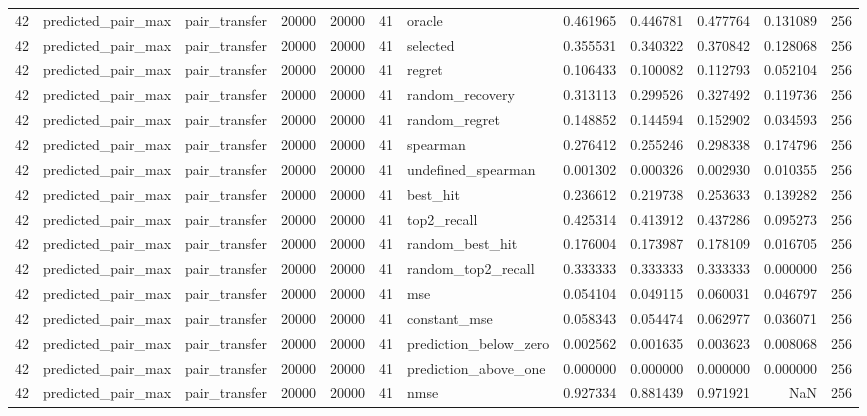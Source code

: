 \begin{tabular}{rllrrrlrrrrr}
42 & predicted_pair_max & pair_transfer & 20000 & 20000 & 41 & oracle & 0.461965 & 0.446781 & 0.477764 & 0.131089 & 256 \\
42 & predicted_pair_max & pair_transfer & 20000 & 20000 & 41 & selected & 0.355531 & 0.340322 & 0.370842 & 0.128068 & 256 \\
42 & predicted_pair_max & pair_transfer & 20000 & 20000 & 41 & regret & 0.106433 & 0.100082 & 0.112793 & 0.052104 & 256 \\
42 & predicted_pair_max & pair_transfer & 20000 & 20000 & 41 & random_recovery & 0.313113 & 0.299526 & 0.327492 & 0.119736 & 256 \\
42 & predicted_pair_max & pair_transfer & 20000 & 20000 & 41 & random_regret & 0.148852 & 0.144594 & 0.152902 & 0.034593 & 256 \\
42 & predicted_pair_max & pair_transfer & 20000 & 20000 & 41 & spearman & 0.276412 & 0.255246 & 0.298338 & 0.174796 & 256 \\
42 & predicted_pair_max & pair_transfer & 20000 & 20000 & 41 & undefined_spearman & 0.001302 & 0.000326 & 0.002930 & 0.010355 & 256 \\
42 & predicted_pair_max & pair_transfer & 20000 & 20000 & 41 & best_hit & 0.236612 & 0.219738 & 0.253633 & 0.139282 & 256 \\
42 & predicted_pair_max & pair_transfer & 20000 & 20000 & 41 & top2_recall & 0.425314 & 0.413912 & 0.437286 & 0.095273 & 256 \\
42 & predicted_pair_max & pair_transfer & 20000 & 20000 & 41 & random_best_hit & 0.176004 & 0.173987 & 0.178109 & 0.016705 & 256 \\
42 & predicted_pair_max & pair_transfer & 20000 & 20000 & 41 & random_top2_recall & 0.333333 & 0.333333 & 0.333333 & 0.000000 & 256 \\
42 & predicted_pair_max & pair_transfer & 20000 & 20000 & 41 & mse & 0.054104 & 0.049115 & 0.060031 & 0.046797 & 256 \\
42 & predicted_pair_max & pair_transfer & 20000 & 20000 & 41 & constant_mse & 0.058343 & 0.054474 & 0.062977 & 0.036071 & 256 \\
42 & predicted_pair_max & pair_transfer & 20000 & 20000 & 41 & prediction_below_zero & 0.002562 & 0.001635 & 0.003623 & 0.008068 & 256 \\
42 & predicted_pair_max & pair_transfer & 20000 & 20000 & 41 & prediction_above_one & 0.000000 & 0.000000 & 0.000000 & 0.000000 & 256 \\
42 & predicted_pair_max & pair_transfer & 20000 & 20000 & 41 & nmse & 0.927334 & 0.881439 & 0.971921 & NaN & 256 \\

\end{tabular}
